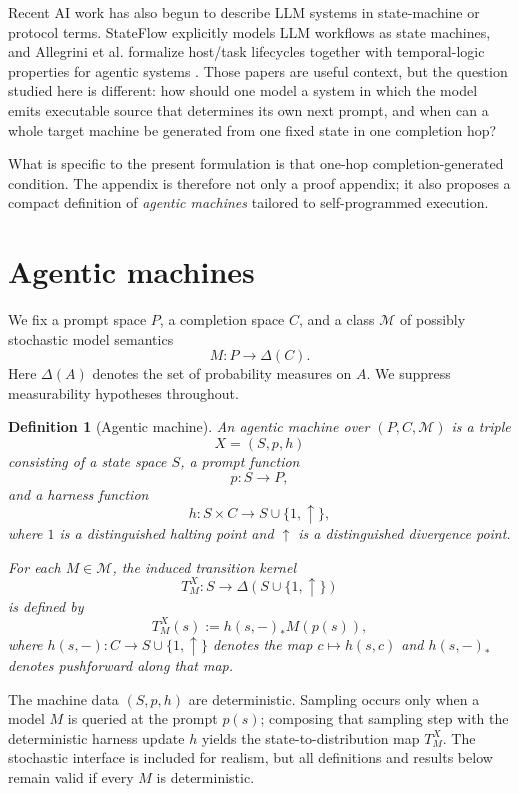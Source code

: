 \documentclass[11pt]{article}
\newtheorem{definition}{Definition}[section]
\begin{document}
Recent AI work has also begun to describe LLM systems in state-machine or protocol terms. StateFlow explicitly models LLM workflows as state machines, and Allegrini et al.
formalize host/task lifecycles together with temporal-logic properties for agentic systems \cite{StateFlow24,Allegrini25}. Those papers are useful context, but the question studied here is different: how should one model a system in which the model emits executable source that determines its own next prompt, and when can a whole target machine be generated from one fixed state in one completion hop?

What is specific to the present formulation is that one-hop completion-generated condition. The appendix is therefore not only a proof appendix; it also proposes a compact definition of \emph{agentic machines} tailored to self-programmed execution.

\section{Agentic machines}

We fix a prompt space $P$, a completion space $C$, and a class $\mathcal{M}$ of possibly stochastic model semantics
\[
M:P\to\Delta(C).
\]
Here $\Delta(A)$ denotes the set of probability measures on $A$. We suppress measurability hypotheses throughout.

\begin{definition}[Agentic machine]\label{def:am}
An \emph{agentic machine} over $(P,C,\mathcal{M})$ is a triple
\[
X=(S,p,h)
\]
consisting of a state space $S$, a prompt function
\[
p:S\to P,
\]
and a harness function
\[
h:S\times C\to S\cup\{1,\uparrow\},
\]
where $1$ is a distinguished halting point and $\uparrow$ is a distinguished divergence point.

For each $M\in\mathcal{M}$, the induced transition kernel
\[
T_M^X:S\to\Delta(S\cup\{1,\uparrow\})
\]
is defined by
\[
T_M^X(s):=h(s,-)_*M(p(s)),
\]
where $h(s,-):C\to S\cup\{1,\uparrow\}$ denotes the map $c\mapsto h(s,c)$ and $h(s,-)_*$ denotes pushforward along that map.
\end{definition}

The machine data $(S,p,h)$ are deterministic. Sampling occurs only when a model $M$ is queried at the prompt $p(s)$; composing that sampling step with the deterministic harness update $h$ yields the state-to-distribution map $T_M^X$. The stochastic interface is included for realism, but all definitions and results below remain valid if every $M$ is deterministic.
\end{document}
